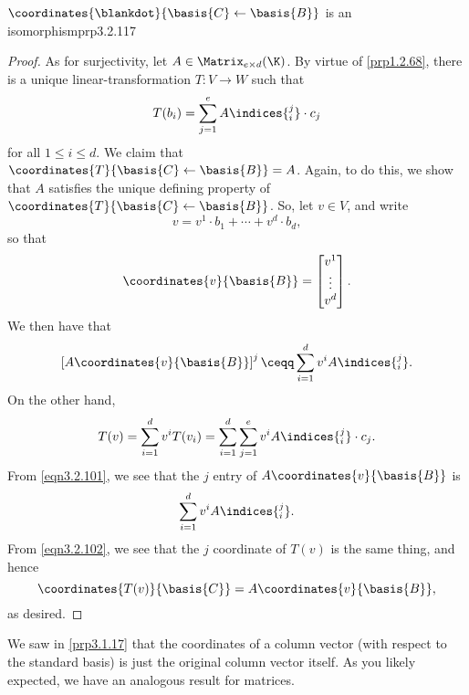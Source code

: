 \begin{prp}{$\coordinates{\blankdot}{\basis{C}\leftarrow \basis{B}}$ is an isomorphism}{prp3.2.117}
\begin{proof}
		As for surjectivity, let $A\in \Matrix _{e\times d}(\K )$.  By virtue of \cref{prp1.2.68}, there is a unique linear-transformation $T\colon V\rightarrow W$ such that
		\begin{equation}
			T(b_i)=\sum _{j=1}^eA\indices{^j_i}\cdot c_j
		\end{equation}
		for all $1\leq i\leq d$.  We claim that $\coordinates{T}{\basis{C}\leftarrow \basis{B}}=A$.  Again, to do this, we show that $A$ satisfies the unique defining property of $\coordinates{T}{\basis{C}\leftarrow \basis{B}}$.  So, let $v\in V$, and write
		\begin{equation}
			v=v^1\cdot b_1+\cdots +v^d\cdot b_d,
		\end{equation}
		so that
		\begin{equation}
			\coordinates{v}{\basis{B}}=\begin{bmatrix}v^1 \\ \vdots \\ v^d\end{bmatrix}.
		\end{equation}
		We then have that
		\begin{equation}\label{eqn3.2.101}
			\left[ A\coordinates{v}{\basis{B}}\right] ^j\ceqq \sum _{i=1}^dv^iA\indices{^j_i}.
		\end{equation}
		On the other hand,
		\begin{equation}\label{eqn3.2.102}
			T(v)=\sum _{i=1}^dv^iT(v_i)=\sum _{i=1}^d\sum _{j=1}^ev^iA\indices{^j_i}\cdot c_j.
		\end{equation}
		From \eqref{eqn3.2.101}, we see that the $j$ entry of $A\coordinates{v}{\basis{B}}$ is
		\begin{equation}
			\sum _{i=1}^dv^iA\indices{^j_i}.
		\end{equation}
		From \eqref{eqn3.2.102}, we see that the $j$ coordinate of $T(v)$ is the same thing, and hence
		\begin{equation}
			\coordinates{T(v)}{\basis{C}}=A\coordinates{v}{\basis{B}},
		\end{equation}
		as desired.
	\end{proof}
\end{prp}
We saw in \cref{prp3.1.17} that the coordinates of a column vector (with respect to the standard basis) is just the original column vector itself.  As you likely expected, we have an analogous result for matrices.
